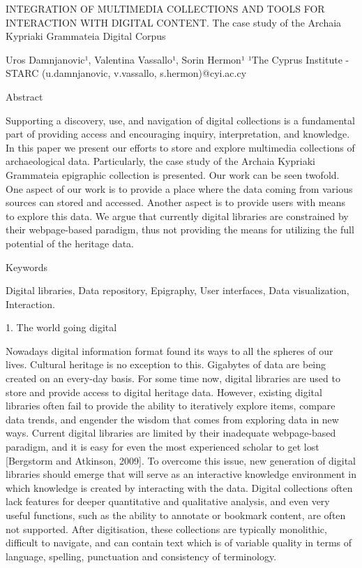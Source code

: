 \documentclass[amsthm,ebook]{saparticle}
\author{valentina}
\date{2015-11-26}
\begin{document}
INTEGRATION OF MULTIMEDIA COLLECTIONS AND TOOLS FOR INTERACTION WITH DIGITAL CONTENT. \newline
The case study of the Archaia Kypriaki Grammateia Digital Corpus

Uros Damnjanovic¹, Valentina Vassallo¹, Sorin Hermon¹\newline
¹The Cyprus Institute - STARC\newline
(u.damnjanovic, v.vassallo, s.hermon)@cyi.ac.cy

Abstract

Supporting a discovery, use, and navigation of digital collections is a fundamental part of providing access and
encouraging inquiry, interpretation, and knowledge. In this paper we present our efforts to store and explore
multimedia collections of archaeological data. Particularly, the case study of the Archaia Kypriaki Grammateia
epigraphic collection is presented. Our work can be seen twofold. One aspect of our work is to provide a place where
the data coming from various sources can stored and accessed. Another aspect is to provide users with means to explore
this data. We argue that currently digital libraries are constrained by their webpage-based paradigm, thus not
providing the means for utilizing the full potential of the heritage data.

Keywords

Digital libraries, Data repository, Epigraphy, User interfaces, Data visualization, Interaction. 

1. The world going digital

Nowadays digital information format found its ways to all the spheres of our lives. Cultural heritage is no exception to
this. Gigabytes of data are being created on an every-day basis. For some time now, digital libraries are used to store
and provide access to digital heritage data. However, existing digital libraries often fail to provide the ability to
iteratively explore items, compare data trends, and engender the wisdom that comes from exploring data in new ways.
Current digital libraries are limited by their inadequate webpage-based paradigm, and it is easy for even the most
experienced scholar to get lost [Bergstorm and Atkinson, 2009]. To overcome this issue, new generation of digital
libraries should emerge that will serve as an interactive knowledge environment in which knowledge is created by
interacting with the data. Digital collections often lack features for deeper quantitative and qualitative analysis,
and even very useful functions, such as the ability to annotate or bookmark content, are often not supported. After
digitisation, these collections are typically monolithic, difficult to navigate, and can contain text which is of
variable quality in terms of language, spelling, punctuation and consistency of terminology. 
\end{document}
